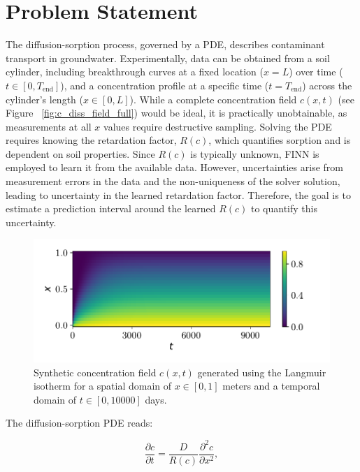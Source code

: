 \section{Problem Statement}
The diffusion-sorption process, governed by a PDE, describes contaminant transport in groundwater. Experimentally, data can be obtained from a soil cylinder, including breakthrough curves at a fixed location ($x=L$) over time ($t \in [0, T_{\text{end}}]$), and a concentration profile at a specific time ($t=T_{\text{end}}$) across the cylinder's length ($x \in [0,L]$). While a complete concentration field $c(x,t)$ (see Figure ~\vref{fig:c_diss_field_full}) would be ideal, it is practically unobtainable, as measurements at all $x$ values require destructive sampling. Solving the PDE requires knowing the retardation factor, $R(c)$, which quantifies sorption and is dependent on soil properties. Since $R(c)$ is typically unknown, FINN is employed to learn it from the available data. However, uncertainties arise from measurement errors in the data and the non-uniqueness of the solver solution, leading to uncertainty in the learned retardation factor. Therefore, the goal is to estimate a prediction interval around the learned $R(c)$ to quantify this uncertainty.

\begin{figure}[h]
    \centering
    \includegraphics{figs/c_diss_field_full.pdf}
    \caption{Synthetic concentration field $c(x,t)$ generated using the Langmuir isotherm for a spatial domain of $x \in [0, 1]$ meters and a temporal domain of $t \in [0, 10000]$ days.}
    \label{fig:c_diss_field_full}
\end{figure}


The diffusion-sorption PDE reads:

\begin{equation}
    \frac{\partial c}{\partial t} = \frac{D}{R(c)} \frac{\partial^2 c}{\partial x^2},
    \label{eq:diff-sorpt-pde}
\end{equation}

